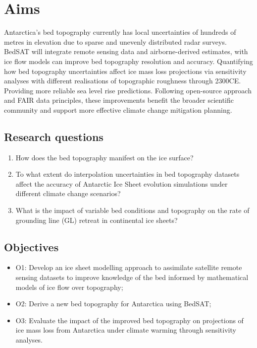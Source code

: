 \chapter{Aims}
Antarctica's bed topography currently has local uncertainties of hundreds of metres in elevation due to sparse and unevenly distributed radar surveys. BedSAT will integrate remote sensing data and airborne-derived estimates, with ice flow models can improve bed topography resolution and accuracy. Quantifying how bed topography uncertainties affect ice mass loss projections via sensitivity analyses with different realisations of topographic roughness through 2300CE. Providing more reliable sea level rise predictions. Following open-source approach and FAIR data principles, these improvements benefit the broader scientific community and support more effective climate change mitigation planning.

\section{Research questions}
\begin{enumerate}
    \item How does the bed topography manifest on the ice surface?
    \item To what extent do interpolation uncertainties in bed topography datasets affect the accuracy of Antarctic Ice Sheet evolution simulations under different climate change scenarios?
    \item What is the impact of variable bed conditions and topography on the rate of grounding line (GL) retreat in continental ice sheets?
\end{enumerate}
\section{Objectives}
\begin{itemize}
    \item{O1:} Develop an ice sheet modelling approach to assimilate satellite remote sensing datasets to improve knowledge of the bed informed by mathematical models of ice flow over topography;
    \item{O2:} Derive a new bed topography for Antarctica using BedSAT;
    \item{O3:} Evaluate the impact of the improved bed topography on projections of ice mass loss from Antarctica under climate warming through sensitivity analyses. 
\end{itemize}